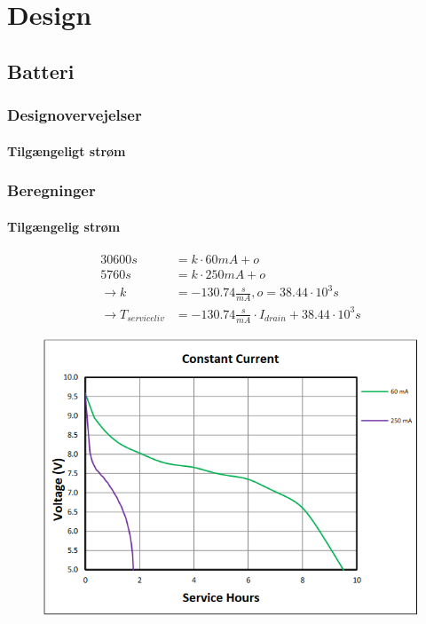 \documentclass[../main.tex]{subfiles}
\begin{document}
\chapter{Design} \label{Chap:Design}

\section{Batteri}

\subsection{Designovervejelser}


\subsubsection{Tilgængeligt strøm}




\subsection{Beregninger}
\subsubsection{Tilgængelig strøm}


\begin{align*}
    30600s &= k \cdot 60mA + o \\
    5760s &= k \cdot 250mA + o \\
    \rightarrow k &= -130.74 \frac{s}{mA}, o = 38.44\cdot 10^3s\\
    \rightarrow T_{serviceliv} &= -130.74\frac{s}{mA} \cdot I_{drain} + 38.44\cdot 10^3s
\end{align*}


 \begin{figure}[H]
    \centering
    \includegraphics[scale=0.8]{Overleaf/Pictures/Grafer/Stroemogspaendingskurve.png}
    \captionsetup{format=hang}
    \caption{}
    \label{fig: batstrømkurve}
\end{figure}
\end{document}
